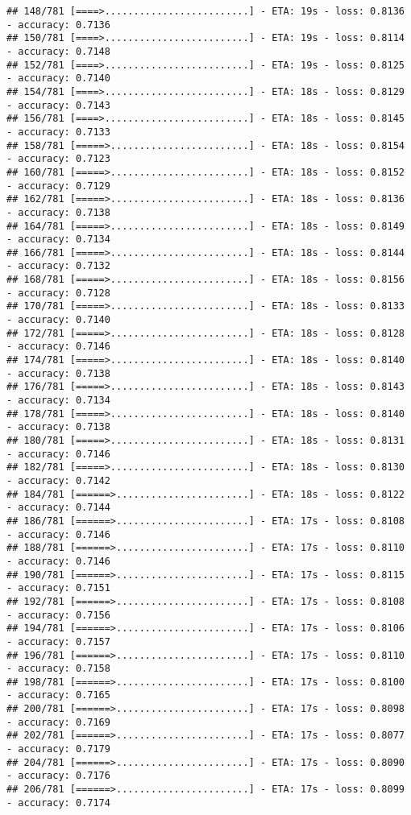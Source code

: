 \documentclass[
]{article}
\begin{document}
\begin{verbatim}
## 148/781 [====>.........................] - ETA: 19s - loss: 0.8136 - accuracy: 0.7136
## 150/781 [====>.........................] - ETA: 19s - loss: 0.8114 - accuracy: 0.7148
## 152/781 [====>.........................] - ETA: 19s - loss: 0.8125 - accuracy: 0.7140
## 154/781 [====>.........................] - ETA: 18s - loss: 0.8129 - accuracy: 0.7143
## 156/781 [====>.........................] - ETA: 18s - loss: 0.8145 - accuracy: 0.7133
## 158/781 [=====>........................] - ETA: 18s - loss: 0.8154 - accuracy: 0.7123
## 160/781 [=====>........................] - ETA: 18s - loss: 0.8152 - accuracy: 0.7129
## 162/781 [=====>........................] - ETA: 18s - loss: 0.8136 - accuracy: 0.7138
## 164/781 [=====>........................] - ETA: 18s - loss: 0.8149 - accuracy: 0.7134
## 166/781 [=====>........................] - ETA: 18s - loss: 0.8144 - accuracy: 0.7132
## 168/781 [=====>........................] - ETA: 18s - loss: 0.8156 - accuracy: 0.7128
## 170/781 [=====>........................] - ETA: 18s - loss: 0.8133 - accuracy: 0.7140
## 172/781 [=====>........................] - ETA: 18s - loss: 0.8128 - accuracy: 0.7146
## 174/781 [=====>........................] - ETA: 18s - loss: 0.8140 - accuracy: 0.7138
## 176/781 [=====>........................] - ETA: 18s - loss: 0.8143 - accuracy: 0.7134
## 178/781 [=====>........................] - ETA: 18s - loss: 0.8140 - accuracy: 0.7138
## 180/781 [=====>........................] - ETA: 18s - loss: 0.8131 - accuracy: 0.7146
## 182/781 [=====>........................] - ETA: 18s - loss: 0.8130 - accuracy: 0.7142
## 184/781 [======>.......................] - ETA: 18s - loss: 0.8122 - accuracy: 0.7144
## 186/781 [======>.......................] - ETA: 17s - loss: 0.8108 - accuracy: 0.7146
## 188/781 [======>.......................] - ETA: 17s - loss: 0.8110 - accuracy: 0.7146
## 190/781 [======>.......................] - ETA: 17s - loss: 0.8115 - accuracy: 0.7151
## 192/781 [======>.......................] - ETA: 17s - loss: 0.8108 - accuracy: 0.7156
## 194/781 [======>.......................] - ETA: 17s - loss: 0.8106 - accuracy: 0.7157
## 196/781 [======>.......................] - ETA: 17s - loss: 0.8110 - accuracy: 0.7158
## 198/781 [======>.......................] - ETA: 17s - loss: 0.8100 - accuracy: 0.7165
## 200/781 [======>.......................] - ETA: 17s - loss: 0.8098 - accuracy: 0.7169
## 202/781 [======>.......................] - ETA: 17s - loss: 0.8077 - accuracy: 0.7179
## 204/781 [======>.......................] - ETA: 17s - loss: 0.8090 - accuracy: 0.7176
## 206/781 [======>.......................] - ETA: 17s - loss: 0.8099 - accuracy: 0.7174

\end{verbatim}
\end{document}
